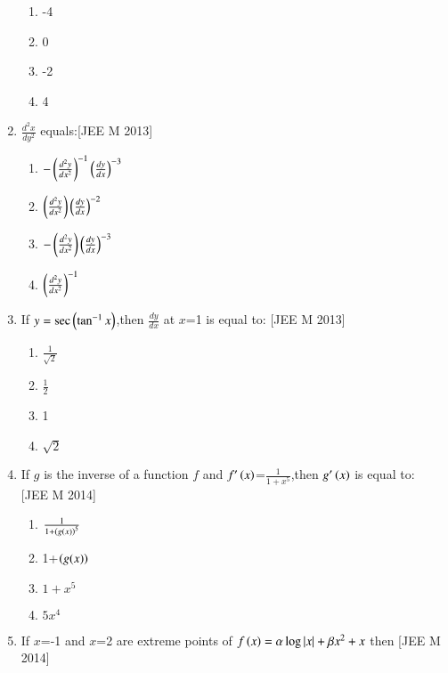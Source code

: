 \documentclass[journal,12pt,twocolumn]{IEEEtran}
\theoremstyle{remark}
\begin{document}
\begin{enumerate}
\begin{multicols}{4}
     
	    \begin{enumerate}
	\item -4
	\item 0
	\item -2
	\item 4
	    \end{enumerate}
     \end{multicols}
    \item $\frac{d^2x}{dy^2}$ equals:\hfill[JEE M 2013]
    \begin{multicols}{2}
        
    
	    \begin{enumerate}
		    \item  $-\left({\frac{d^2y}{dx^2}}\right)^{-1}\left({\frac{dy}{dx}}\right)^{-3}$
		    \item $\left({\frac{d^2y}{dx^2}}\right)\left({\frac{dy}{dx}}\right)^{-2}$

		    \item $-\left({\frac{d^2y}{dx^2}}\right)\left({\frac{dy}{dx}}\right)^{-3}$
		    \item $\left(\frac{d^2y}{dx^2}\right)^{-1}$
	    \end{enumerate}
     \end{multicols}
    \item If $y=\sec\left(\tan^{-1}x\right)$,then $\frac{dy}{dx}$ at $x$=1 is equal to:
    \hfill[JEE M 2013]

\begin{multicols}{2}
    

     \begin{enumerate}
     \item $\frac{1}{\sqrt{2}}$
     \item $\frac{1}{2}$
     \item 1
     \item $\sqrt{2}$
     \end{enumerate}
     \end{multicols}
      \item If $g$ is the inverse of a function $f$ and $f^{\prime}\left(x\right)$=$\frac{1}{1+x^5}$,then $g^{\prime}\left(x\right)$ is equal to:\\    
      \hfill[JEE M 2014]
      \begin{multicols}{2}
          
      
      \begin{enumerate}
      \item $\frac{1}{1+\left({g(x)}\right)^5}$
      \item 1+$\left({g(x)}\right)$
      \item $1+x^5$
      \item $5x^4$
      \end{enumerate}
      \end{multicols}
      \item If $x$=-1 and $x$=2 are extreme points of $f\left(x\right)=\alpha\log\left\vert x\right\vert+\beta x^2+x$ then 
	      \hfill[JEE M 2014]
       \begin{multicols}{2}
           

\end{multicols}
\end{enumerate}
\end{document}
